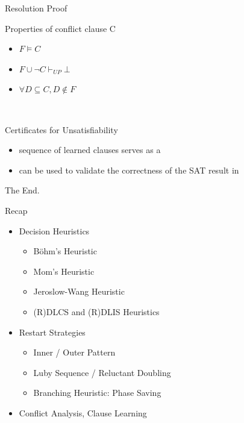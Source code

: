 \documentclass[t]{sdqbeamer}
\begin{document}
			
\begin{frame}{Resolution Proof}
\begin{blueblock}{Properties of conflict clause C}
\begin{itemize}\setlength{\itemsep}{1em}
	\item $F \models C$ 
	\item $F \cup \lnot C \vdash_{UP} \bot$
	\item $\forall D \subseteq C, D \notin F$
\end{itemize}
\end{blueblock}~\\
\begin{blueblock}{Certificates for Unsatisfiability}
\begin{itemize}\setlength{\itemsep}{1em}
	\item sequence of learned clauses serves as a 
	\item can be used to validate the correctness of the SAT result in 
\end{itemize}
\end{blueblock}
\end{frame}

\begin{frame}{The End.}
\begin{block}{Recap}
	\begin{itemize}\setlength{\itemsep}{1em}
		\item Decision Heuristics
		\begin{itemize}\setlength{\itemsep}{1ex}
			\item Böhm's Heuristic
			\item Mom's Heuristic
			\item Jeroslow-Wang Heuristic
			\item (R)DLCS and (R)DLIS Heuristics
		\end{itemize}
		\item Restart Strategies
		\begin{itemize}\setlength{\itemsep}{1ex}
			\item Inner / Outer Pattern
			\item Luby Sequence / Reluctant Doubling
			\item Branching Heuristic: Phase Saving
		\end{itemize}
		\item Conflict Analysis, Clause Learning
	\end{itemize}
\end{block}
\end{frame}
\end{document}
